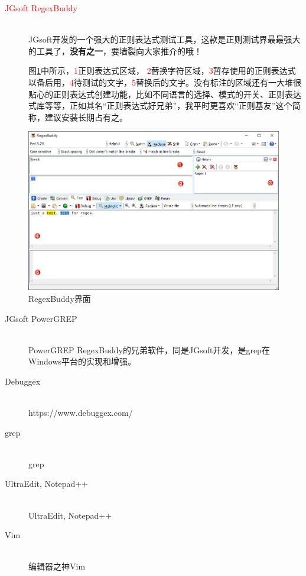 \documentclass[12pt,a4paper,twoside]{ctexart}
\begin{document}
\clearpage{}
\begin{description}
\item[\textcolor{red}{JGsoft RegexBuddy}] \hfill \\
  JGsoft开发的一个强大的正则表达式测试工具，这款是正则测试界最最强大的工具了，\textbf{没有之一}，要墙裂向大家推介的哦！\Smiley \par
  图\ref{fig:regexbuddy}中所示，\textcolor{red}{\textcircled{\footnotesize{1}}}正则表达式区域， \textcolor{red}{\textcircled{\footnotesize{2}}}替换字符区域，\textcolor{red}{\textcircled{\footnotesize{3}}}暂存使用的正则表达式以备后用，\textcolor{red}{\textcircled{\footnotesize{4}}}待测试的文字，\textcolor{red}{\textcircled{\footnotesize{5}}}替换后的文字。没有标注的区域还有一大堆很贴心的正则表达式创建功能，比如不同语言的选择、模式的开关、正则表达式库等等，正如其名“正则表达式好兄弟”，我平时更喜欢“正则基友”这个简称，\Smiley 建议安装长期占有之。 \par
\end{description}
\begin{figure}[htbp]
  \centering
  \includegraphics[width=18cm]{FIG/regexbuddy.png}
  \caption{RegexBuddy界面}
  \label{fig:regexbuddy}
\end{figure}
\clearpage{}

\begin{description}
\item[JGsoft PowerGREP] \hfill \\
  PowerGREP RegexBuddy的兄弟软件，同是JGsoft开发，是grep在Windows平台的实现和增强。
\item[Debuggex] \hfill \\
  https://www.debuggex.com/
\item[grep] \hfill \\
  grep
\item[UltraEdit, Notepad++] \hfill \\
  UltraEdit, Notepad++
\item[Vim] \hfill \\
  编辑器之神Vim
\end{description}
\end{document}
